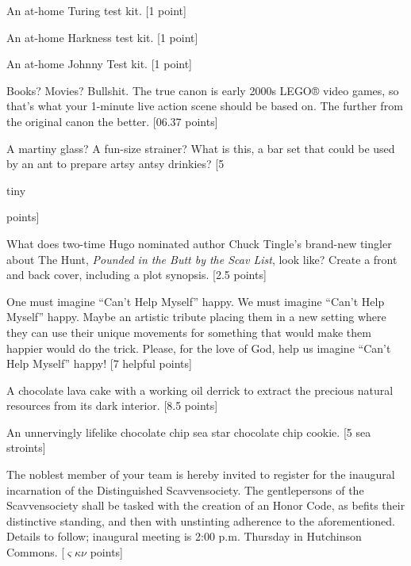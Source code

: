 \documentclass{book}
\begin{document}
\begin{list}{}{}
\item An at-home Turing test kit. [1 point]
\item An at-home Harkness test kit. [1 point]
\item An at-home Johnny Test kit. [1 point]
\item Books? Movies? Bullshit. The true canon is early 2000s LEGO® video games, so that's what your 1-minute live action scene should be based on. The further from the original canon the better. [06.37 points] \textleaf
\item A martiny glass? A fun-size strainer? What is this, a bar set that could be used by an ant to prepare artsy antsy drinkies? [5 \begin{tiny} tiny \end{tiny} points]
\item What does two-time Hugo nominated author Chuck Tingle’s brand-new tingler about The Hunt, \textit{Pounded in the Butt by the Scav List}, look like? Create a front and back cover, including a plot synopsis. [2.5 points]
\item One must imagine “Can’t Help Myself” happy. We must imagine “Can’t Help Myself” happy. Maybe an artistic tribute placing them in a new setting where they can use their unique movements for something that would make them happier would do the trick. Please, for the love of God, help us imagine “Can’t Help Myself” happy! [7 helpful points]
\item A chocolate lava cake with a working oil derrick to extract the precious natural resources from its dark interior. [8.5 points]
\item An unnervingly lifelike chocolate chip sea star chocolate chip cookie. [5 sea stroints]
\item The noblest member of your team is hereby invited to register for the inaugural incarnation of the Distinguished Scavvensociety. The gentlepersons of the Scavvensociety shall be tasked with the creation of an Honor Code, as befits their distinctive standing, and then with unstinting adherence to the aforementioned. Details to follow; inaugural meeting is 2:00 p.m. Thursday in Hutchinson Commons. [$\varsigma$$\kappa$$\nu$ points]


\end{list}
\end{document}
